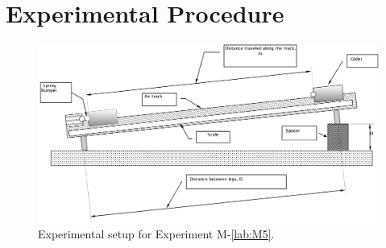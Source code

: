 \section{Experimental Procedure}

\begin{figure}
  \begin{center}
    \includegraphics[width=5.8in]{Fall/Experiment04Figures/M04_fig2.png}
  \end{center}
  \caption{Experimental setup for Experiment M-\ref{lab:M5}.}
  \label{M05Fig03}
\end{figure}

